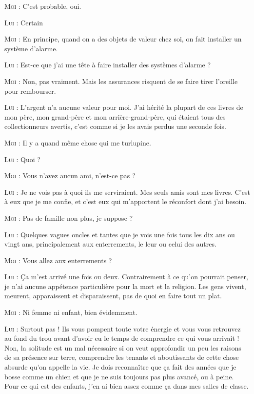 \begin{dialogue}
\textsc{Moi} : C’est probable, oui.

\textsc{Lui} : Certain

\textsc{Moi} : En principe, quand on a des objets de valeur chez soi, on fait installer un système d’alarme.

\textsc{Lui} : Est-ce que j’ai une tête à faire installer des systèmes d’alarme ?

\textsc{Moi} : Non, pas vraiment. Mais les assurances risquent de se faire tirer l’oreille pour rembourser.

\textsc{Lui} : L’argent n’a aucune valeur pour moi. J’ai hérité la plupart de ces livres de mon père, mon grand-père et mon arrière-grand-père, qui étaient tous des collectionneurs avertis, c’est comme si je les avais perdus une seconde fois.

\textsc{Moi} : Il y a quand même chose qui me turlupine.

\textsc{Lui} : Quoi ?

\textsc{Moi} : Vous n’avez aucun ami, n’est-ce pas ?

\textsc{Lui} : Je ne vois pas à quoi ils me serviraient. Mes seuls amis sont mes livres. C’est à eux que je me confie, et c’est eux qui m’apportent le réconfort dont j’ai besoin.

\textsc{Moi} : Pas de famille non plus, je suppose ?

\textsc{Lui} : Quelques vagues oncles et tantes que je vois une fois tous les dix ans ou vingt ans, principalement aux enterrements, le leur ou celui des autres.

\textsc{Moi} : Vous allez aux enterrements ?

\textsc{Lui} : Ça m’est arrivé une fois ou deux. Contrairement à ce qu’on pourrait penser, je n’ai aucune appétence particulière pour la mort et la religion. Les gens vivent, meurent, apparaissent et disparaissent, pas de quoi en faire tout un plat.

\textsc{Moi} : Ni femme ni enfant, bien évidemment.

\textsc{Lui} : Surtout pas ! Ils vous pompent toute votre énergie et vous vous retrouvez au fond du trou avant d’avoir eu le temps de comprendre ce qui vous arrivait ! Non, la solitude est un mal nécessaire si on veut approfondir un peu les raisons de sa présence sur terre, comprendre les tenants et aboutissants de cette chose absurde qu’on appelle la vie. Je dois reconnaître que ça fait des années que je bosse comme un chien et que je ne suis toujours pas plus avancé, ou à peine. Pour ce qui est des enfants, j’en ai bien assez comme ça dans mes salles de classe.


\end{dialogue}
